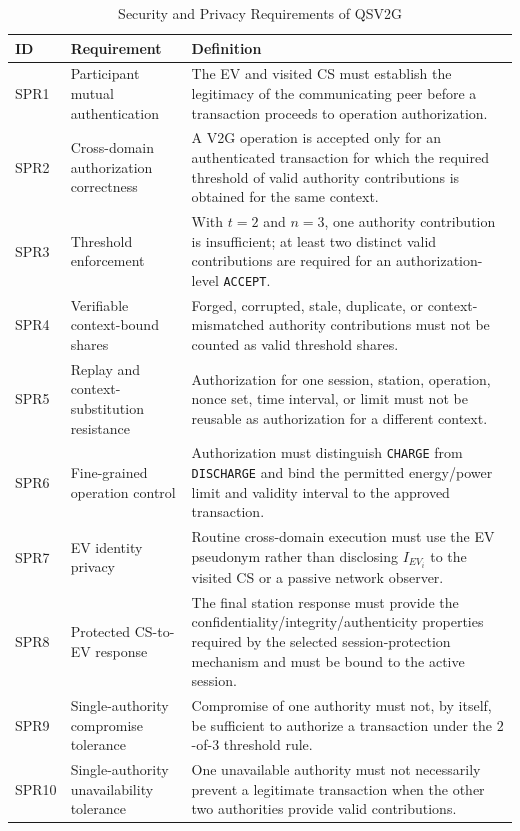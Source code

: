 \documentclass[twocolumn,10pt,journal]{IEEEtran}
\begin{document}
\begin{table}[!t]
\caption{Security and Privacy Requirements of QSV2G}
\label{secreq}
\centering
\scriptsize
\renewcommand{\arraystretch}{1.14}
\begin{tabular}{@{}p{}p{}p{}@{}}
\hline
ID & Requirement & Definition\\
\hline
SPR1 & Participant mutual authentication & The EV and visited CS must establish the legitimacy of the communicating peer before a transaction proceeds to operation authorization.\\
SPR2 & Cross-domain authorization correctness & A V2G operation is accepted only for an authenticated transaction for which the required threshold of valid authority contributions is obtained for the same context.\\
SPR3 & Threshold enforcement & With $t=2$ and $n=3$, one authority contribution is insufficient; at least two distinct valid contributions are required for an authorization-level \texttt{ACCEPT}.\\
SPR4 & Verifiable context-bound shares & Forged, corrupted, stale, duplicate, or context-mismatched authority contributions must not be counted as valid threshold shares.\\
SPR5 & Replay and context-substitution resistance & Authorization for one session, station, operation, nonce set, time interval, or limit must not be reusable as authorization for a different context.\\
SPR6 & Fine-grained operation control & Authorization must distinguish \texttt{CHARGE} from \texttt{DISCHARGE} and bind the permitted energy/power limit and validity interval to the approved transaction.\\
SPR7 & EV identity privacy & Routine cross-domain execution must use the EV pseudonym rather than disclosing $I_{EV_i}$ to the visited CS or a passive network observer.\\
SPR8 & Protected CS-to-EV response & The final station response must provide the confidentiality/integrity/authenticity properties required by the selected session-protection mechanism and must be bound to the active session.\\
SPR9 & Single-authority compromise tolerance & Compromise of one authority must not, by itself, be sufficient to authorize a transaction under the $2$-of-$3$ threshold rule.\\
SPR10 & Single-authority unavailability tolerance & One unavailable authority must not necessarily prevent a legitimate transaction when the other two authorities provide valid contributions.\\

\end{tabular}
\end{table}
\end{document}
